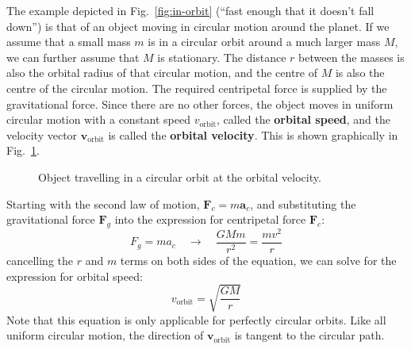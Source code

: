 The example depicted in Fig.~\ref{fig:in-orbit} (``fast enough that it doesn't
fall down'') is that of an object moving in circular motion around the planet.
If we assume that a small mass $m$ is in a circular orbit around a much larger
mass $M$, we can further assume that $M$ is stationary. The distance $r$
between the masses is also the orbital radius of that circular motion, and the
centre of $M$ is also the centre of the circular motion. The required
centripetal force is supplied by the gravitational force. Since there are no
other forces, the object moves in uniform circular motion with a constant speed
$v_\text{orbit}$, called the \textbf{orbital speed}, and the velocity vector
$\bm v_\text{orbit}$ is called the \textbf{orbital velocity}. This is shown
graphically in Fig.~\ref{fig:orbital-velocity}.
\begin{figure}[ht]
  \centering
  \caption{Object travelling in a circular orbit at the orbital velocity.}
  \label{fig:orbital-velocity}
\end{figure}

Starting with the second law of motion, $\bm F_c=m\bm a_c$, and
substituting the gravitational force $\bm F_g$ into the expression for
centripetal force $\bm F_c$:
\begin{equation}
  F_g=ma_c\quad\longrightarrow\quad \frac{GMm}{r^2}=\frac{mv^2}r
\end{equation}
cancelling the $r$ and $m$ terms on both sides of the equation, we can solve
for the expression for orbital speed:
\begin{equation}
  \boxed{
    v_\text{orbit}=\sqrt{\frac{GM}r}
  }
  \label{eq:orbital-velocity}
\end{equation}
Note that this equation is only applicable for perfectly circular orbits. Like
all uniform circular motion, the direction of $\bm v_\text{orbit}$ is
tangent to the circular path.



